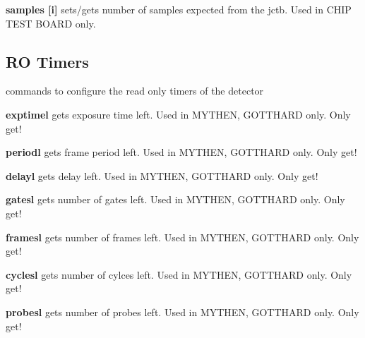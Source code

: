 \begin{DoxyItemize}
\item {\bfseries samples \mbox{[}i\mbox{]}} sets/gets number of samples expected from the jctb. Used in CHIP TEST BOARD only.
\end{DoxyItemize}\hypertarget{config_configrotimers}{}\subsection{RO Timers}\label{config_configrotimers}
commands to configure the read only timers of the detector


\begin{DoxyItemize}
\item {\bfseries exptimel} gets exposure time left. Used in MYTHEN, GOTTHARD only. Only get!
\end{DoxyItemize}


\begin{DoxyItemize}
\item {\bfseries periodl} gets frame period left. Used in MYTHEN, GOTTHARD only. Only get!
\end{DoxyItemize}


\begin{DoxyItemize}
\item {\bfseries delayl} gets delay left. Used in MYTHEN, GOTTHARD only. Only get!
\end{DoxyItemize}


\begin{DoxyItemize}
\item {\bfseries gatesl} gets number of gates left. Used in MYTHEN, GOTTHARD only. Only get!
\end{DoxyItemize}


\begin{DoxyItemize}
\item {\bfseries framesl} gets number of frames left. Used in MYTHEN, GOTTHARD only. Only get!
\end{DoxyItemize}


\begin{DoxyItemize}
\item {\bfseries cyclesl} gets number of cylces left. Used in MYTHEN, GOTTHARD only. Only get!
\end{DoxyItemize}


\begin{DoxyItemize}
\item {\bfseries probesl} gets number of probes left. Used in MYTHEN, GOTTHARD only. Only get!
\end{DoxyItemize}


